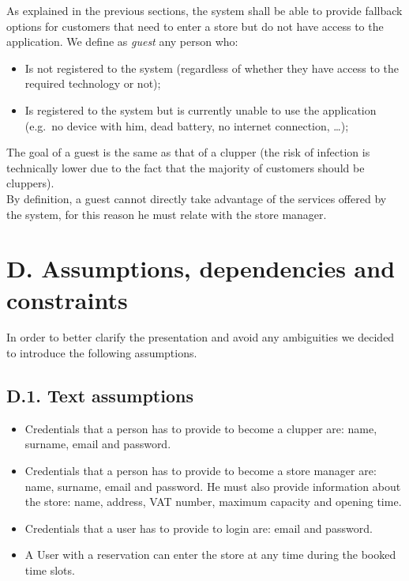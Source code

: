 As explained in the previous sections, the system shall be able to provide fallback options for customers that need to enter a store but do not have access to the application. We define as \emph{guest} any person who:
\begin{itemize}
\tightlist
\item
    Is not registered to the system (regardless of whether they have access to the required technology or not);
\item
    Is registered to the system but is currently unable to use the application (e.g.~no device with him, dead battery, no internet connection, \ldots);
\end{itemize}

The goal of a guest is the same as that of a clupper (the risk of infection is technically lower due to the fact that the majority of customers should be cluppers).\\
By definition, a guest cannot directly take advantage of the services offered by the system, for this reason he must relate with the store manager.

\clearpage
\section{D. Assumptions, dependencies and constraints}

In order to better clarify the presentation and avoid any ambiguities we decided to introduce the following assumptions.

\subsection{D.1. Text assumptions}

\begin{itemize}
\item
  Credentials that a person has to provide to become a clupper are: name, surname, email and password.
\item
  Credentials that a person has to provide to become a store manager are: name, surname, email and password. He must also provide information about the store: name, address, VAT number, maximum capacity and opening time.
\item
  Credentials that a user has to provide to login are: email and password.
\item
  A User with a reservation can enter the store at any time during the booked time slots.
\end{itemize}

